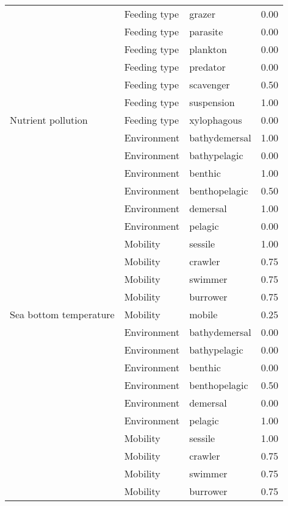 \documentclass[
  12pt,
]{article}
\begin{document}
\begin{longtable}{llll}
 & Feeding type & grazer & 0.00\\
\cmidrule{2-4}
 & Feeding type & parasite & 0.00\\
\cmidrule{2-4}
 & Feeding type & plankton & 0.00\\
\cmidrule{2-4}
 & Feeding type & predator & 0.00\\
\cmidrule{2-4}
 & Feeding type & scavenger & 0.50\\
\cmidrule{2-4}
 & Feeding type & suspension & 1.00\\
\cmidrule{2-4}
\multirow{-9}{*}{\raggedright\arraybackslash Nutrient pollution} & Feeding type & xylophagous & 0.00\\
\cmidrule{1-4}
 & Environment & bathydemersal & 1.00\\
\cmidrule{2-4}
 & Environment & bathypelagic & 0.00\\
\cmidrule{2-4}
 & Environment & benthic & 1.00\\
\cmidrule{2-4}
 & Environment & benthopelagic & 0.50\\
\cmidrule{2-4}
 & Environment & demersal & 1.00\\
\cmidrule{2-4}
 & Environment & pelagic & 0.00\\
\cmidrule{2-4}
 & Mobility & sessile & 1.00\\
\cmidrule{2-4}
 & Mobility & crawler & 0.75\\
\cmidrule{2-4}
 & Mobility & swimmer & 0.75\\
\cmidrule{2-4}
 & Mobility & burrower & 0.75\\
\cmidrule{2-4}
\multirow{-11}{*}{\raggedright\arraybackslash Sea bottom temperature} & Mobility & mobile & 0.25\\
\cmidrule{1-4}
 & Environment & bathydemersal & 0.00\\
\cmidrule{2-4}
 & Environment & bathypelagic & 0.00\\
\cmidrule{2-4}
 & Environment & benthic & 0.00\\
\cmidrule{2-4}
 & Environment & benthopelagic & 0.50\\
\cmidrule{2-4}
 & Environment & demersal & 0.00\\
\cmidrule{2-4}
 & Environment & pelagic & 1.00\\
\cmidrule{2-4}
 & Mobility & sessile & 1.00\\
\cmidrule{2-4}
 & Mobility & crawler & 0.75\\
\cmidrule{2-4}
 & Mobility & swimmer & 0.75\\
\cmidrule{2-4}
 & Mobility & burrower & 0.75\\

\end{longtable}
\end{document}
